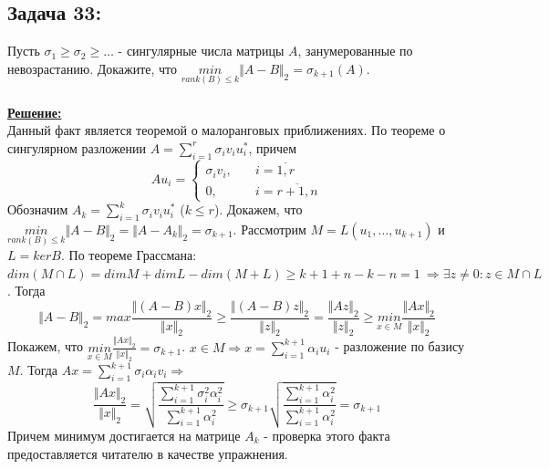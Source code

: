 \documentclass[a4paper,12pt,titlepage,final]{article}
\begin{document}
\subsection*{Задача 33:}
\noindent Пусть $\sigma_1 \geq \sigma_2 \geq \ldots$ - сингулярные числа матрицы $A$, занумерованные по невозрастанию.
Докажите, что $\underset{rank(B) \leq k}{min} \Vert A - B \Vert_2 = \sigma_{k+1}(A)$.\\ \\
\textbf{\underline{Решение:}} \\
Данный факт является теоремой о малоранговых приближениях. По теореме о сингулярном разложении $A = \sum_{i=1}^r \sigma_iv_iu_i^*$, причем
$$Au_i =
    \begin{cases}
    \sigma_iv_i, &\quad i = \overline{1,r} \\
    0, &\quad i = \overline{r+1, n}
    \end{cases} $$
Обозначим $A_k = \sum_{i=1}^k \sigma_iv_iu_i^*$ ($k \leq r$). Докажем, что $\underset{rank(B) \leq k}{min} \Vert A - B \Vert_2 = \Vert A - A_k \Vert_2 = \sigma_{k+1}$.
Рассмотрим $M = L(u_1, \ldots, u_{k+1})$ и $L = kerB$. По теореме Грассмана: $dim(M\cap L) = dimM + dimL - dim(M + L) \geq k + 1 + n - k - n = 1 \
\Rightarrow \exists z \neq 0: z \in M \cap L$. Тогда 
$$\Vert A - B\Vert_2 = max \frac{\Vert (A - B)x\Vert_2}{\Vert x\Vert_2} \geq \frac{\Vert (A - B)z\Vert_2}{\Vert z\Vert_2} = \frac{\Vert Az\Vert_2}{\Vert z\Vert_2} \geq \underset{x\in M}{min} \frac{\Vert Ax\Vert_2}{\Vert x\Vert_2}$$
Покажем, что $\underset{x\in M}{min}\frac{\Vert Ax\Vert_2}{\Vert x\Vert_2} = \sigma_{k+1}$. $x \in M \Rightarrow x = \sum_{i=1}^{k+1}\alpha_iu_i$ - разложение по базису $M$.
Тогда $Ax = \sum_{i=1}^{k+1}\sigma_i\alpha_iv_i \Rightarrow$
$$\frac{\Vert Ax\Vert_2}{\Vert x\Vert_2} = \sqrt{\frac{\sum_{i=1}^{k+1}\sigma_i^2\alpha_i^2}{\sum_{i=1}^{k+1}\alpha_i^2}}
\geq \sigma_{k+1} \sqrt{\frac{\sum_{i=1}^{k+1}\alpha_i^2}{\sum_{i=1}^{k+1}\alpha_i^2}} = \sigma_{k+1}$$
Причем минимум достигается на матрице $A_k$ - проверка этого факта предоставляется читателю в качестве упражнения. \blacksquare \\ \\ \\

\end{document}
